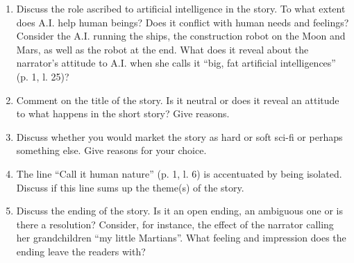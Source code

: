 \documentclass[10pt,a4paper,table]{article}
\newcommand{\qm}[1]{``#1''}
\begin{document}
\begin{enumerate}
  \item Discuss the role ascribed to artificial intelligence in the story. To what extent does A.I. help human beings? Does it conflict with human needs and feelings? Consider the A.I. running the ships, the construction robot on the Moon and Mars, as well as the robot at the end. What does it reveal about the narrator's attitude to A.I. when she calls it \qm{big, fat artificial intelligences} (p. 1, l. 25)?
  \item Comment on the title of the story. Is it neutral or does it reveal an attitude to what happens in the short story? Give reasons.
  \item Discuss whether you would market the story as hard or soft sci-fi or perhaps something else. Give reasons for your choice.
  \item The line \qm{Call it human nature} (p. 1, l. 6) is accentuated by being isolated. Discuss if this line sums up the theme(s) of the story.
  \item Discuss the ending of the story. Is it an open ending, an ambiguous one or is there a resolution? Consider, for instance, the effect of the narrator calling her grandchildren \qm{my little Martians}. What feeling and impression does the ending leave the readers with?
\end{enumerate}
\end{document}
